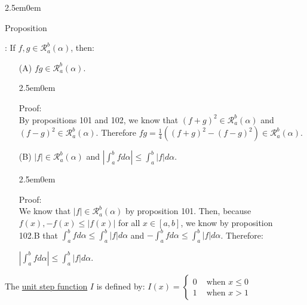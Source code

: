 \documentclass{book}
\newcommand{\hTwo}{%
   \color{MidnightBlue}%
   \fontsize{13}{15}\selectfont%
}
\newcommand{\hThree}{%
   \color{PineGreen!85!Orange}
   \fontsize{13}{15}\selectfont%
}
\newenvironment{myIndent}{%
   \begin{adjustwidth}{2.5em}{0em}%
}{%
   \end{adjustwidth}%
}
\newcommand{\udefine}[1]{{%
   \setulcolor{Red}%
   \setul{0.14em}{0.07em}%
   \ul{#1}%
}}
\newcounter{PropNumber}
\newcommand{\propCount}[1][1]{%
   \addtocounter{PropNumber}{#1}%
   \thePropNumber%
}
\newcommand{\retTwo}{\hfill\bigbreak}
\begin{document}
{\begin{myIndent}\hTwo
   Proposition \propCount: If $f, g \in \mathscr{R}_a^b(\alpha)$, then:
   \begin{enumerate}
      \item[(A)] $fg \in \mathscr{R}_a^b(\alpha)$.\\[-6pt]
      {\begin{myIndent}\hThree
         Proof:\\
         By propositions 101 and 102, we know that $(f + g)^2 \in \mathscr{R}_a^b(\alpha)$ and\\ $(f - g)^2 \in \mathscr{R}_a^b(\alpha)$.   Therefore {\fontsize{12.8}{14.8}\selectfont$fg = \frac{1}{4}\left((f+g)^2 - (f-g)^2\right) \in \mathscr{R}_a^b(\alpha)$}.
      \end{myIndent}}
      
      \newpage

      \item[(B)] $|f| \in \mathscr{R}_a^b(\alpha)$ and $\left|\int_a^b fd\alpha\right| \leq \int_a^b |f|d\alpha$.\\ [-6pt]
      
      {\begin{myIndent}\hThree
         Proof:\\
         We know that $|f| \in \mathscr{R}_a^b(\alpha)$ by proposition 101. Then, because\\ $f(x), -f(x) \leq |f(x)|$ for all $x \in [a, b]$, we know by proposition\\ 102.B that $\int_a^bfd\alpha \leq \int_a^b|f|d\alpha$ and $-\int_a^bfd\alpha \leq \int_a^b|f|d\alpha$. Therefore:
         
         {\centering$\left|\int_a^b fd\alpha\right| \leq \int_a^b |f|d\alpha$.\retTwo\retTwo\par}
      \end{myIndent}}
   \end{enumerate}
\end{myIndent}}

The \udefine{unit step function} $I$ is defined by: $I(x) = \left\{
\begin{matrix}
   0 & \text{ when } x \leq 0 \\
   1 & \text{ when } x > 1
\end{matrix}\right.$\retTwo
\end{document}
